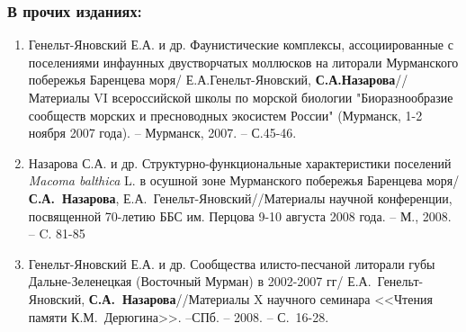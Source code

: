 {{\begin{small}
\subsubsection*{В прочих изданиях:}
\begin{enumerate}
\item Генельт-Яновский Е.А. и др. Фаунистические комплексы, ассоциированные с поселениями инфаунных двустворчатых моллюсков на литорали Мурманского побережья Баренцева моря/ Е.А.Генельт-Яновский, \textbf{С.А.Назарова}// Материалы VI всероссийской школы по морской биологии "Биоразнообразие сообществ морских и пресноводных экосистем России" (Мурманск, 1-2 ноября 2007 года). -- Мурманск, 2007. -- С.45-46.
\item Назарова С.А. и др. Структурно-функциональные характеристики поселений \textit{Macoma balthica} L. в осушной зоне Мурманского побережья Баренцева моря/ \textbf{С.А.~Назарова}, Е.А.~Генельт-Яновский//Материалы научной конференции, посвященной 70-летию ББС им. Перцова 9-10 августа 2008 года. -- М., 2008. -- C. 81-85
\item Генельт-Яновский Е.А. и др. Сообщества илисто-песчаной литорали губы Дальне-Зеленецкая (Восточный Мурман) в 2002-2007 гг/ Е.А.~Генельт-Яновский, \textbf{С.А.~Назарова}//Материалы X научного семинара <<Чтения памяти К.М.~Дерюгина>>. --СПб. -- 2008. -- С.~16-28.
\end{enumerate}


\end{small}}}
